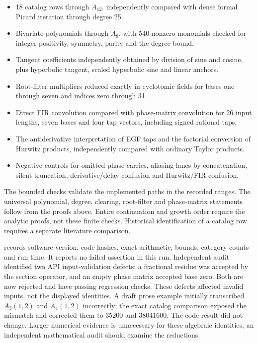 \begin{itemize}
\tightlist
\item
  18 catalog rows through \(A_{12}\), independently compared with dense
  formal Picard iteration through degree 25.
\item
  Bivariate polynomials through \(A_8\), with 540 nonzero monomials
  checked for integer positivity, symmetry, parity and the degree bound.
\item
  Tangent coefficients independently obtained by division of sine and
  cosine, plus hyperbolic tangent, scaled hyperbolic sine and linear anchors.
\item
  Root-filter multipliers reduced exactly in cyclotomic fields for bases
  one through seven and indices zero through 31.
\item
  Direct FIR convolution compared with phase-matrix convolution for 26
  input lengths, seven bases and four tap vectors, including signed
  rational taps.
\item
  The antiderivative interpretation of EGF taps and the factorial
  conversion of Hurwitz products, independently compared with ordinary
  Taylor products.
\item
  Negative controls for omitted phase carries, aliasing lanes by
  concatenation, silent truncation, derivative/delay confusion and
  Hurwitz/FIR confusion.
\end{itemize}

The bounded checks validate the implemented paths in the recorded
ranges. The universal polynomial, degree, clearing, root-filter and
phase-matrix statements follow from the proofs above. Entire continuation and growth order require the analytic proofs, not these
finite checks. Historical identification of a catalog row requires a
separate literature comparison.

 records software version,
code hashes, exact arithmetic, bounds, category counts and run time. It
reports no failed assertion in this run. Independent audit identified
two API input-validation defects: a fractional residue was accepted by
the section operator, and an empty phase matrix accepted base zero. Both
are now rejected and have passing regression checks. These defects
affected invalid inputs, not the displayed identities. A draft prose
example initially transcribed \(A_3(1,2)\) and \(A_4(1,2)\) incorrectly;
the exact catalog comparison exposed the mismatch and corrected them to
\(35200\) and \(38041600\). The code result did not change. Larger
numerical evidence is unnecessary for these algebraic identities; an
independent mathematical audit should examine the reductions.
